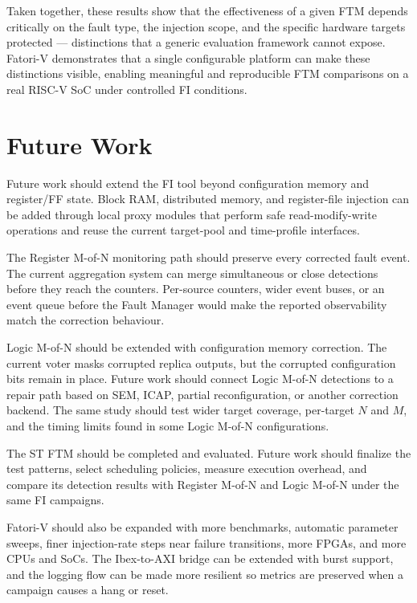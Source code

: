 Taken together, these results show that the effectiveness of a given \ac{FTM} depends critically on the fault type, the injection scope, and the specific hardware targets protected — distinctions that a generic evaluation framework cannot expose. \ac{Fatori-V} demonstrates that a single configurable platform can make these distinctions visible, enabling meaningful and reproducible \ac{FTM} comparisons on a real \ac{RISC-V} \ac{SoC} under controlled \ac{FI} conditions.

\section{Future Work}
\label{chap10:future}

Future work should extend the \ac{FI} tool beyond configuration memory and register/\ac{FF} state. Block \ac{RAM}, distributed memory, and register-file injection can be added through local proxy modules that perform safe read-modify-write operations and reuse the current target-pool and time-profile interfaces.

The Register M-of-N monitoring path should preserve every corrected fault event. The current aggregation system can merge simultaneous or close detections before they reach the counters. Per-source counters, wider event buses, or an event queue before the Fault Manager would make the reported observability match the correction behaviour.

Logic M-of-N should be extended with configuration memory correction. The current voter masks corrupted replica outputs, but the corrupted configuration bits remain in place. Future work should connect Logic M-of-N detections to a repair path based on \ac{SEM}, \ac{ICAP}, partial reconfiguration, or another correction backend. The same study should test wider target coverage, per-target $N$ and $M$, and the timing limits found in some Logic M-of-N configurations.

The \ac{ST} \ac{FTM} should be completed and evaluated. Future work should finalize the test patterns, select scheduling policies, measure execution overhead, and compare its detection results with Register M-of-N and Logic M-of-N under the same \ac{FI} campaigns.

\ac{Fatori-V} should also be expanded with more benchmarks, automatic parameter sweeps, finer injection-rate steps near failure transitions, more \acp{FPGA}, and more \acp{CPU} and \acp{SoC}. The Ibex-to-\ac{AXI} bridge can be extended with burst support, and the logging flow can be made more resilient so metrics are preserved when a campaign causes a hang or reset.